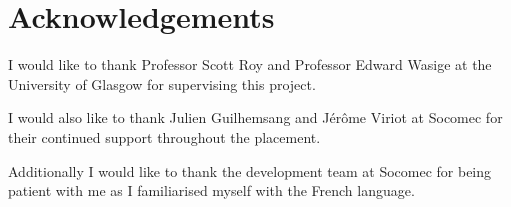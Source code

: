 \chapter{Acknowledgements}


I would like to thank Professor Scott Roy and Professor Edward Wasige at the University of Glasgow for supervising this project.

I would also like to thank Julien Guilhemsang and J\'er\^ome Viriot at Socomec for their continued support throughout the placement. 

Additionally I would like to thank the development team at Socomec for 
being patient with me as I familiarised myself with the French language.
